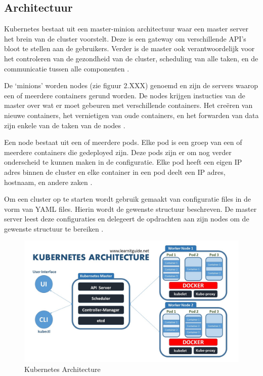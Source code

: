 \subsection{Architectuur}
Kubernetes bestaat uit een master-minion architectuur waar een master server het brein van de cluster voorstelt. Deze is een gateway om verschillende API's bloot te stellen aan de gebruikers. Verder is de master ook verantwoordelijk voor het controleren van de gezondheid van de cluster, scheduling van alle taken, en de communicatie tussen alle componenten \autocite{ellingwood2018}.

De `minions' worden nodes (zie figuur 2.XXX) genoemd en zijn de servers waarop een of meerdere containers gerund worden. De nodes krijgen instucties van de master over wat er moet gebeuren met verschillende containers. Het creëren van nieuwe containers, het vernietigen van oude containers, en het forwarden van data zijn enkele van de taken van de nodes \autocite{ellingwood2018}.

Een node bestaat uit een of meerdere pods. Elke pod is een groep van een of meerdere containers die gedeployed zijn. Deze pods zijn er om nog verder onderscheid te kunnen maken in de configuratie. Elke pod heeft een eigen IP adres binnen de cluster en elke container in een pod deelt een IP adres, hostnaam, en andere zaken \autocite{learnitguide2018}.

Om een cluster op te starten wordt gebruik gemaakt van configuratie files in de vorm van YAML files. Hierin wordt de gewenste structuur beschreven. De master server leest deze configuraties en delegeert de opdrachten aan zijn nodes om de gewenste structuur te bereiken \autocite{ellingwood2018}.

\begin{figure}[ht]
    \centering
   \includegraphics[scale=0.4]{img/kubernetes_architecture_explained}
    \caption[Kubernetes Architecture]{Kubernetes Architecture \cite{learnitguide2018}}
\end{figure}

